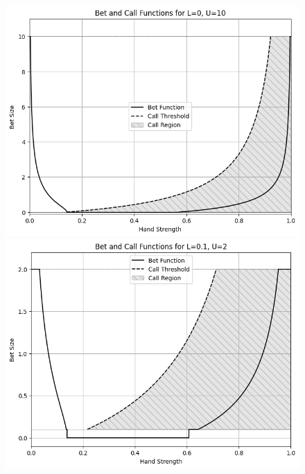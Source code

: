 \documentclass[a4paper,12pt]{article}
\theoremstyle{plain}
\theoremstyle{definition}
\begin{document}
\begin{figure}[h!]
    \begin{adjustwidth}{-1in}{-1in}
        \centering
        \begin{minipage}{0.6\textwidth}
            \centering
            \includegraphics[width=\textwidth]{limit_continuous_0_10.png}
        \end{minipage}
        \hspace{0.05\textwidth}
        \begin{minipage}{0.6\textwidth}
            \centering
            \includegraphics[width=\textwidth]{limit_continuous_0.1_2.png}
        \end{minipage}

\end{adjustwidth}
\end{figure}
\end{document}
